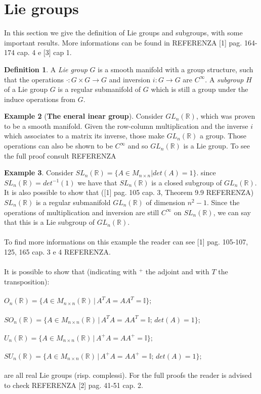\documentclass[12pt,a4paper]{report}
\theoremstyle{definition}
\newtheorem{Def}{Definition}[chapter]
\theoremstyle{Theorem}
\theoremstyle{definition}
\newtheorem{Ex}[Def]{Example}
\theoremstyle{definition}
\begin{document}
		\section{Lie groups}
		In this section we give the definition of Lie groups and subgroups, with some important results. More informations can be found in REFERENZA [1] pag. 164-174 cap. 4 e [3] cap 1.
		\begin{Def}
			A \textit{Lie group} $G$ is a smooth manifold with a group structure, such that the operations $\cdot:G\times G\rightarrow G$ and inversion $i:G\rightarrow G$ are $C^\infty$.
			A \textit{subgroup} $H$ of a Lie group $G$ is a regular submanifold of $G$ which is still a group under the induce operations from $G$.
		\end{Def}
		\begin{Ex}[\textbf{The eneral inear group}] 
			Consider $GL_n(\mathbb{R})$, which was proven to be a smooth manifold. Given the row-column multiplication and the inverse $i$ which associates to a matrix its inverse, those make $GL_n(\mathbb{R})$ a group. Those operations can also be shown to be $C^\infty$ and so $GL_n(\mathbb{R})$ is a Lie group. To see the full proof consult REFERENZA
		\end{Ex}
		\begin{Ex}
			Consider $SL_n(\mathbb{R})=\{A\in M_{n\times n}| det(A)=1\}$. since $SL_n(\mathbb{R})=det^{-1}(1)$ we have that $SL_n(\mathbb{R})$ is a closed subgroup of $GL_n(\mathbb{R})$. It is also possible to show that ([1] pag. 105 cap. 3, Theorem 9.9 REFERENZA) $SL_n(\mathbb{R})$ is a regular submanifold $GL_n(\mathbb{R})$ of dimension $n^2-1$. Since the operations of multiplication and inversion are still $C^\infty$ on $SL_n(\mathbb{R})$, we can say that this is a Lie subgroup of $GL_n(\mathbb{R})$.\\
			\\
			To find more informations on this example the reader can see [1] pag. 105-107, 125, 165 cap. 3 e 4 REFERENZA.\\
			\\
			It is possible to show that (indicating with $^+$ the adjoint and with $T$ the transposition):\\\\
			$O_n(\mathbb{R})=\{A\in M_{n\times n}(\mathbb{R})\, |\, A^TA=AA^T=\mathbb{I}\};$\\\\
			$SO_n(\mathbb{R})=\{A\in M_{n\times n}(\mathbb{R})\, |\, A^TA=AA^T=\mathbb{I};\, det(A)=1\};$\\\\
			$U_n(\mathbb{R})=\{A\in M_{n\times n}(\mathbb{R})\, |\, A^+A=AA^+=\mathbb{I}\};$\\\\
			$SU_n(\mathbb{R})=\{A\in M_{n\times n}(\mathbb{R})\, |\, A^+A=AA^+=\mathbb{I};\,det(A)=1\};$\\\\
			are all real Lie groups (risp. complessi). 
			For the full proofs the reader is advised to check REFERENZA [2] pag. 41-51 cap. 2.
		\end{Ex}
\end{document}
